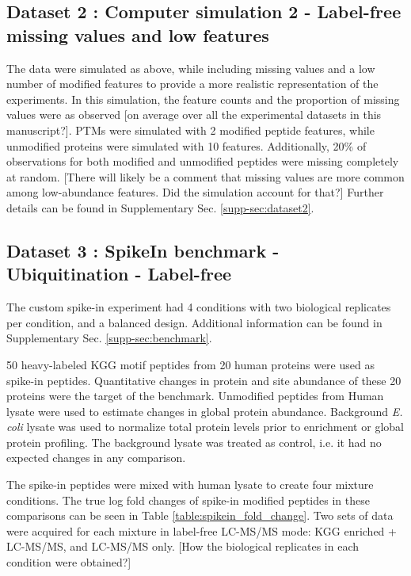\documentclass[mcp]{article}
\numberwithin{table}{section}
\def\todo#1{{\color{red}[#1]}}
\begin{document}
\subsection*{Dataset 2 : Computer simulation 2 - Label-free missing values and low features}
\label{sec:comp_sim_procedure2}

The data were simulated as above, while including missing values and a low number of modified features to provide a more realistic representation of the experiments. In this simulation, the feature counts and the proportion of missing values were as observed \todo{on average over all the experimental datasets in this manuscript?}. PTMs were simulated with 2 modified peptide features, while unmodified proteins were simulated with 10 features. Additionally, 20\% of observations for both modified and unmodified peptides were missing completely at random. \todo{There will likely be a comment that missing values are more common among low-abundance features. Did the simulation account for that?} Further details can be found in Supplementary Sec. \ref{supp-sec:dataset2}.
 
\subsection*{Dataset 3 : SpikeIn benchmark - Ubiquitination - Label-free}
\label{sec:exp_proc_dataset3}

The custom spike-in experiment had 4 conditions with two biological replicates per condition, and a balanced design. Additional information can be found in Supplementary Sec. \ref{supp-sec:benchmark}. 


\medskip {} 50 heavy-labeled KGG motif peptides from 20 human proteins were used as spike-in peptides. Quantitative changes in protein and site abundance of these 20 proteins were the target of the benchmark.  Unmodified peptides from Human lysate were used to estimate changes in global protein abundance. Background {\it E. coli} lysate was used to normalize total protein levels prior to enrichment or global protein profiling. The background lysate was treated as control, i.e. it had no expected changes in any comparison. 

The spike-in peptides were mixed with human lysate to create four mixture conditions. The true log fold changes of spike-in modified peptides in these comparisons can be seen in Table \ref{table:spikein_fold_change}.  Two sets of data were acquired for each mixture in label-free LC-MS/MS mode: KGG enriched + LC-MS/MS, and LC-MS/MS only. \todo{How the biological replicates in each condition were obtained?}
\end{document}
